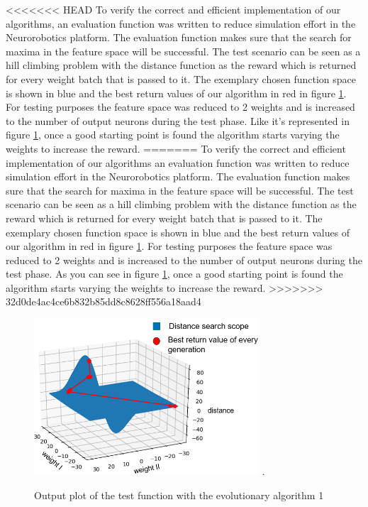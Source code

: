 <<<<<<< HEAD
To verify the correct and efficient implementation of our algorithms, an evaluation function was written to reduce simulation effort in the Neurorobotics platform. The evaluation function makes sure that the search for maxima in the feature space will be successful. The test scenario can be seen as a hill climbing problem with the distance function as the reward which is returned for every weight batch that is passed to it. The exemplary chosen function space is shown in blue and the best return values of our algorithm in red in figure \ref{fig:test_function}. For testing purposes the feature space was reduced to 2 weights and is increased to the number of output neurons during the test phase.
Like it's represented in figure \ref{fig:test_function}, once a good starting point is found the algorithm starts varying the weights to increase the reward. 
=======
To verify the correct and efficient implementation of our algorithms an evaluation function was written to reduce simulation effort in the Neurorobotics platform. The evaluation function makes sure that the search for maxima in the feature space will be successful. The test scenario can be seen as a hill climbing problem with the distance function as the reward which is returned for every weight batch that is passed to it. The exemplary chosen function space is shown in blue and the best return values of our algorithm in red in figure \ref{fig:test_function}. For testing purposes the feature space was reduced to 2 weights and is increased to the number of output neurons during the test phase.
As you can see in figure \ref{fig:test_function}, once a good starting point is found the algorithm starts varying the weights to increase the reward. 
>>>>>>> 32d0de4ac4ce6b832b85dd8c8628ff556a18aad4

\begin{figure}[H]
	\centering
	\includegraphics[width=3.3in]{img/test_function.png}
	\DeclareGraphicsExtensions.
	\caption{Output plot of the test function with the evolutionary algorithm 1}
	\label{fig:test_function}
\end{figure}

